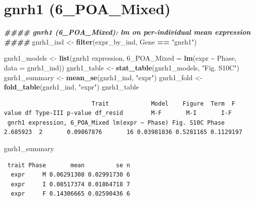 \documentclass[
  landscape]{article}
\newenvironment{Shaded}{\begin{snugshade}}{\end{snugshade}}
\newcommand{\AttributeTok}[1]{\textcolor[rgb]{0.13,0.29,0.53}{#1}}
\newcommand{\DocumentationTok}[1]{\textcolor[rgb]{0.56,0.35,0.01}{\textbf{\textit{#1}}}}
\newcommand{\FunctionTok}[1]{\textcolor[rgb]{0.13,0.29,0.53}{\textbf{#1}}}
\newcommand{\NormalTok}[1]{#1}
\newcommand{\OtherTok}[1]{\textcolor[rgb]{0.56,0.35,0.01}{#1}}
\newcommand{\SpecialCharTok}[1]{\textcolor[rgb]{0.81,0.36,0.00}{\textbf{#1}}}
\newcommand{\StringTok}[1]{\textcolor[rgb]{0.31,0.60,0.02}{#1}}
\begin{document}
\section{gnrh1 (6\_POA\_Mixed)}\label{gnrh1-6_poa_mixed}

\begin{Shaded}
\begin{Highlighting}[]
\DocumentationTok{\#\#\#\# gnrh1 (6\_POA\_Mixed): lm on per{-}individual mean expression \#\#\#\#}
\NormalTok{gnrh1\_ind }\OtherTok{\textless{}{-}} \FunctionTok{filter}\NormalTok{(expr\_by\_ind, Gene }\SpecialCharTok{==} \StringTok{"gnrh1"}\NormalTok{)}

\NormalTok{gnrh1\_models }\OtherTok{\textless{}{-}} \FunctionTok{list}\NormalTok{(}\StringTok{\textasciigrave{}}\AttributeTok{gnrh1 expression, 6\_POA\_Mixed}\StringTok{\textasciigrave{}} \OtherTok{=} \FunctionTok{lm}\NormalTok{(expr }\SpecialCharTok{\textasciitilde{}}\NormalTok{ Phase, }\AttributeTok{data =}\NormalTok{ gnrh1\_ind))}
\NormalTok{gnrh1\_table }\OtherTok{\textless{}{-}} \FunctionTok{stat\_table}\NormalTok{(gnrh1\_models, }\StringTok{"Fig. S10C"}\NormalTok{)}
\NormalTok{gnrh1\_summary }\OtherTok{\textless{}{-}} \FunctionTok{mean\_se}\NormalTok{(gnrh1\_ind, }\StringTok{"expr"}\NormalTok{)}
\NormalTok{gnrh1\_fold }\OtherTok{\textless{}{-}} \FunctionTok{fold\_table}\NormalTok{(gnrh1\_ind, }\StringTok{"expr"}\NormalTok{)}
\NormalTok{gnrh1\_table}
\end{Highlighting}
\end{Shaded}

\begin{verbatim}
                         Trait            Model    Figure  Term  F value df Type-III p-value df_resid        M-F       M-I       I-F
 gnrh1 expression, 6_POA_Mixed lm(expr ~ Phase) Fig. S10C Phase 2.685923  2       0.09867876       16 0.03981836 0.5281165 0.1129197
\end{verbatim}

\begin{Shaded}
\begin{Highlighting}[]
\NormalTok{gnrh1\_summary}
\end{Highlighting}
\end{Shaded}

\begin{verbatim}
 trait Phase       mean         se n
  expr     M 0.06291308 0.02991730 6
  expr     I 0.08517374 0.01864718 7
  expr     F 0.14306665 0.02590436 6
\end{verbatim}
\end{document}
